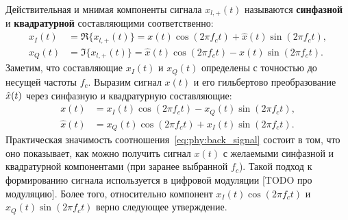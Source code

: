 \documentclass{book}
\numberwithin{theorem}{chapter}
\numberwithin{statement}{chapter}
\numberwithin{lemma}{chapter}
\theoremstyle{definition}
\numberwithin{task}{chapter}
\theoremstyle{remark}
\numberwithin{example}{chapter}
\theoremstyle{definition}
\numberwithin{definition}{chapter}
\theoremstyle{remark}
\theoremstyle{remark}
\numberwithin{lyrics}{section}
\begin{document}
Действительная и мнимая компоненты сигнала $x_{l,+}(t)$ называются \textbf{синфазной} и \textbf{квадратурной} составляющими соответственно:
\begin{align}
x_{I}(t) &= \Re \{x_{l,+}(t)\} = x(t) \cos(2\pi f_c t)  + \hat{x}(t) \sin(2 \pi f_c t),  \label{eq:phy:inphase}\\
x_{Q}(t) &= \Im \{x_{l,+}(t)\} = \hat{x}(t) \cos(2 \pi f_c t) - x(t) \sin(2 \pi f_c t).  \label{eq:phy:qphase}
\end{align}
Заметим, что составляющие $x_{I}(t)$ и $x_{Q}(t)$ определены с точностью до несущей частоты $f_c$. Выразим сигнал $x(t)$ и его гильбертово преобразование $\hat{x}(t)$ через синфазную и квадратурную составляющие:
\begin{align}
x(t) &= x_{I}(t) \cos(2\pi f_c t) - x_Q(t) \sin(2 \pi f_c t), \label{eq:phy:back_signal}\\
\hat{x}(t) &= x_{Q}(t) \cos(2 \pi f_c t) + x_{I}(t) \sin(2 \pi f_c t). \label{eq:phy:back_hilbert}
\end{align}
Практическая значимость соотношения~\eqref{eq:phy:back_signal} состоит в том, что оно показывает, как можно получить сигнал $x(t)$ с желаемыми синфазной и квадратурной компонентами (при заранее выбранной $f_c$). Такой подход к формированию сигнала используется в цифровой модуляции [TODO про модуляцию]. Более того, относительно компонент $x_{I}(t) \cos(2\pi f_c t)$ и  $x_Q(t) \sin(2 \pi f_c t)$ верно следующее утверждение.
\end{document}
